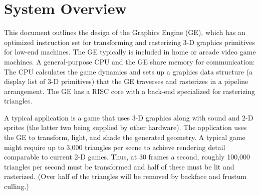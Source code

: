 \documentclass{book}
\begin{document}
\newcommand{\formatRA}[2]{
\formatRRI{#1}{#2}
}

\newcommand{\formatAR}[2]{
\formatRRI{#1}{#2}
}

\newcommand{\formatA}[2]{
{\scriptsize
\begin{picture}(32,4)(0, 0)
\put(.5,-.5){\fboxsep 0pt\colorbox{shadowgray}{\makebox(32,4){}}}
\put(0,0){\fboxsep 0pt\colorbox{white}{\framebox(32,4){}}}
\put(0,0){\framebox(6,4){\shortstack{{#1}\\{\small\tt #2}}}}
\put(6,0){\fboxsep 0pt\colorbox{unusedgray}{\framebox(5,4){\small 0}}}
\put(11,0){\framebox(5,4){\small r2}}
\put(16,0){\framebox(16,4){\small imm}}
\put(1,4.9){\makebox(0,0){31}}
\put(5,4.9){\makebox(0,0){26}}
\put(7,4.9){\makebox(0,0){25}}
\put(10,4.9){\makebox(0,0){21}}
\put(12,4.9){\makebox(0,0){20}}
\put(15,4.9){\makebox(0,0){16}}
\put(17,4.9){\makebox(0,0){15}}
\put(31.5,4.9){\makebox(0,0){0}}
\put(3,-1.5){\makebox(0,0){6}}
\put(8.5,-1.5){\makebox(0,0){5}}
\put(13.5,-1.5){\makebox(0,0){5}}
\put(24,-1.5){\makebox(0,0){16}}
\end{picture}
}
}

\newenvironment{indented}[1]{\vspace{2ex}\noindent{\bf #1}\begin{list}{}{\setlength{\topsep}{0em}}\item}{\end{list}}

\chapter{System Overview}

This document outlines the design of the Graphics Engine (GE), which
has an optimized instruction set for transforming and rasterizing 3-D
graphics primitives for low-end machines.  The GE typically is
included in home or arcade video game machines.  A general-purpose CPU
and the GE share memory for communication: The CPU calculates the
game dynamics and sets up a graphics data structure (a display list of
3-D primitives) that the GE traverses and rasterizes in a pipeline
arrangement.  The GE has a RISC core with a back-end specialized
for rasterizing triangles.

A typical application is a game that uses 3-D graphics along with
sound and 2-D sprites (the latter two being supplied by other
hardware).  The application uses the GE to transform, light, and shade
the generated geometry.  A typical game might require up to
3,000 triangles per scene to achieve rendering detail comparable to
current 2-D games.  Thus, at 30 frames a second, roughly 100,000
triangles per second must be transformed and half of these must be lit
and rasterized.  (Over half of the triangles will be removed by
backface and frustum culling.)
\end{document}

